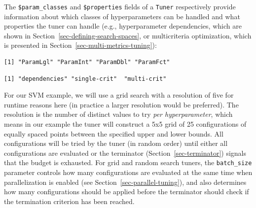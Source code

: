 \begin{tcolorbox}[enhanced jigsaw, opacitybacktitle=0.6, rightrule=.15mm, opacityback=0, arc=.35mm, breakable, titlerule=0mm, colframe=quarto-callout-tip-color-frame, coltitle=black, bottomrule=.15mm, toprule=.15mm, colback=white, colbacktitle=quarto-callout-tip-color!10!white, bottomtitle=1mm, toptitle=1mm, title=\textcolor{quarto-callout-tip-color}{\faLightbulb}\hspace{0.5em}{\texttt{\$param\_classes} and \texttt{\$properties}}, leftrule=.75mm, left=2mm]

The \texttt{\$param\_classes} and \texttt{\$properties} fields of a
\texttt{Tuner} respectively provide information about which classes of
hyperparameters can be handled and what properties the tuner can handle
(e.g., hyperparameter dependencies, which are shown in
Section~\ref{sec-defining-search-spaces}, or multicriteria optimization,
which is presented in Section~\ref{sec-multi-metrics-tuning}):

\begin{Shaded}
\begin{Highlighting}[]
\NormalTok{(}\NormalTok{)}\SpecialCharTok{$}
\end{Highlighting}
\end{Shaded}

\begin{verbatim}
[1] "ParamLgl" "ParamInt" "ParamDbl" "ParamFct"
\end{verbatim}

\begin{Shaded}
\begin{Highlighting}[]
\NormalTok{(}\NormalTok{)}\SpecialCharTok{$}
\end{Highlighting}
\end{Shaded}

\begin{verbatim}
[1] "dependencies" "single-crit"  "multi-crit"  
\end{verbatim}

\end{tcolorbox}

For our SVM example, we will use a grid search with a resolution of five
for runtime reasons here (in practice a larger resolution would be
preferred). The resolution is the number of distinct values to try
\emph{per hyperparameter}, which means in our example the tuner will
construct a 5x5 grid of 25 configurations of equally spaced points
between the specified upper and lower bounds. All configurations will be
tried by the tuner (in random order) until either all configurations are
evaluated or the terminator (Section~\ref{sec-terminator}) signals that
the budget is exhausted. For grid and random search tuners, the
\texttt{batch\_size} parameter controls how many configurations are
evaluated at the same time when parallelization is enabled (see
Section~\ref{sec-parallel-tuning}), and also determines how many
configurations should be applied before the terminator should check if
the termination criterion has been reached.

